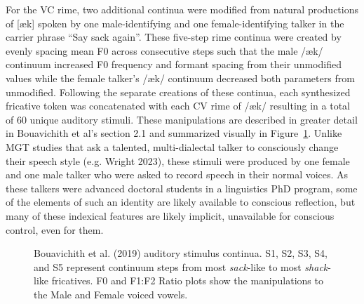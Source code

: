 \documentclass[
  letterpaper,
  DIV=11,
  numbers=noendperiod]{scrartcl}
\begin{document}
For the VC rime, two additional continua were modified from natural
productions of {[}æk{]} spoken by one male-identifying and one
female-identifying talker in the carrier phrase ``Say sack again''.
These five-step rime continua were created by evenly spacing mean F0
across consecutive steps such that the male /æk/ continuum increased F0
frequency and formant spacing from their unmodified values while the
female talker's /æk/ continuum decreased both parameters from
unmodified. Following the separate creations of these continua, each
synthesized fricative token was concatenated with each CV rime of /æk/
resulting in a total of 60 unique auditory stimuli. These manipulations
are described in greater detail in Bouavichith et al's section 2.1 and
summarized visually in Figure~\ref{fig-stimuli}. Unlike MGT studies that
ask a talented, multi-dialectal talker to consciously change their
speech style (e.g. Wright 2023), these stimuli were produced by one
female and one male talker who were asked to record speech in their
normal voices. As these talkers were advanced doctoral students in a
linguistics PhD program, some of the elements of such an identity are
likely available to conscious reflection, but many of these indexical
features are likely implicit, unavailable for conscious control, even
for them.

\begin{figure}


\caption{\label{fig-stimuli}Bouavichith et al. (2019) auditory stimulus
continua. S1, S2, S3, S4, and S5 represent continuum steps from most
\emph{sack}-like to most \emph{shack}-like fricatives. F0 and F1:F2
Ratio plots show the manipulations to the Male and Female voiced
vowels.}

\end{figure}%
\end{document}
